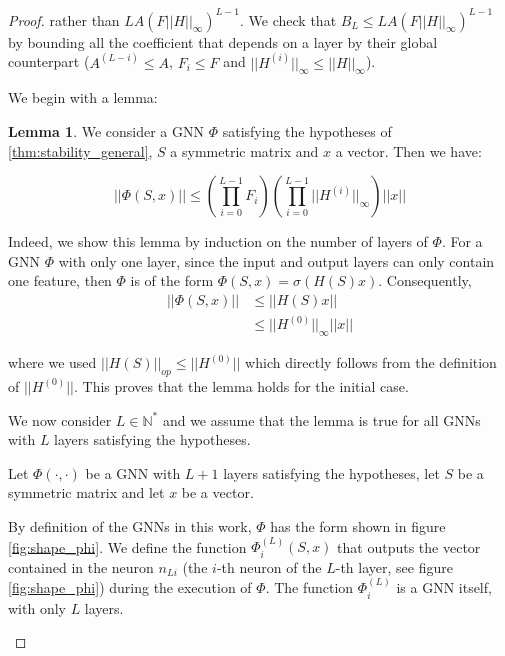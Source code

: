 \documentclass[11pt,a4paper]{article}
\newcommand{\op}[1]{|| #1 ||_{op}}
\newcommand{\ninf}[1]{|| #1 ||_\infty}
\newcommand{\Prod}[2]{\overset{#2}{\underset{#1}{\prod}}}
\theoremstyle{definition}
\newtheorem{lemma}[theorem]{Lemma}
\renewcommand{\leq}{\leqslant}
\begin{document}
\begin{proof}
            rather than $L A (F \ninf{H} )^ {L-1}$. We check that $B_L \leq L A (F \ninf{H} )^ {L-1}$ by bounding all the coefficient that depends on a layer by their global counterpart ($A^{(L-i)} \leq A$, $F_i \leq F$ and $\ninf{H^{(i)}} \leq \ninf{H}$).
            
            We begin with a lemma:

            \begin{lemma}
                We consider a GNN $\Phi$ satisfying the hypotheses of \ref{thm:stability_general}, $S$ a symmetric matrix and $x$ a vector. Then we have:

                    $$ || \Phi(S,x) || \leq \left( \Prod{i=0}{L-1} F_i \right) \left( \Prod{i=0}{L-1} \ninf{H^{(i)}} \right) ||x|| $$
            \end{lemma}

            Indeed, we show this lemma by induction on the number of layers of $\Phi$. For a GNN $\Phi$ with only one layer, since the input and output layers can only contain one feature, then $\Phi$ is of the form $\Phi(S,x) = \sigma(H(S)x)$. Consequently, 
            \begin{align*}
                || \Phi (S,x) || &\leq || H(S) x || \\
                                 &\leq \ninf{H^{(0)}} ||x||
            \end{align*}

            where we used $\op{H(S)} \leq ||H^{(0)}||$ which directly follows from the definition of $||H^{(0)}||$. This proves that the lemma holds for the initial case.

            We now consider $L \in \mathbb{N}^*$ and we assume that the lemma is true for all GNNs with $L$ layers satisfying the hypotheses.

            Let $\Phi (\cdot,\cdot)$ be a GNN with $L+1$ layers satisfying the hypotheses, let $S$ be a symmetric matrix and let $x$ be a vector.

            By definition of the GNNs in this work, $\Phi$ has the form shown in figure \ref{fig:shape_phi}. We define the function $\Phi^{(L)}_i (S,x)$ that outputs the vector contained in the neuron $n_{Li}$ (the $i$-th neuron of the $L$-th layer, see figure \ref{fig:shape_phi}) during the execution of $\Phi$. The function $\Phi^{(L)}_i$ is a GNN itself, with only $L$ layers.

            \begin{figure}
            \centering
\end{figure}
\end{proof}
\end{document}
